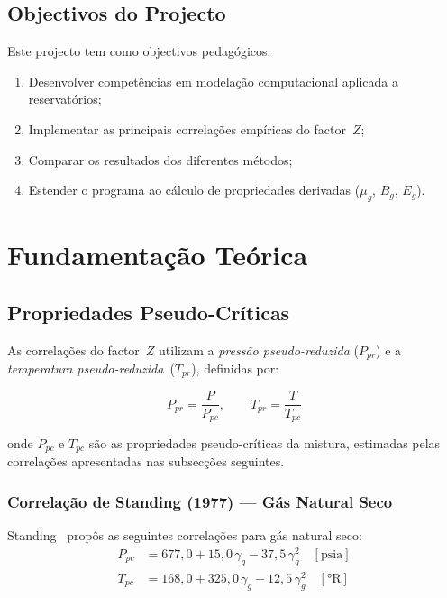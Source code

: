 \documentclass[12pt,a4paper]{article}
\begin{document}
\subsection{Objectivos do Projecto}

Este projecto tem como objectivos pedagógicos:
\begin{enumerate}[noitemsep]
  \item Desenvolver competências em modelação computacional aplicada a reservatórios;
  \item Implementar as principais correlações empíricas do factor~$Z$;
  \item Comparar os resultados dos diferentes métodos;
  \item Estender o programa ao cálculo de propriedades derivadas ($\mu_g$, $B_g$, $E_g$).
\end{enumerate}

\section{Fundamentação Teórica}

\subsection{Propriedades Pseudo-Críticas}

As correlações do factor~$Z$ utilizam a \emph{pressão pseudo-reduzida}
($P_{pr}$) e a \emph{temperatura pseudo-reduzida}~($T_{pr}$), definidas por:

\begin{equation}
  P_{pr} = \frac{P}{P_{pc}}, \qquad T_{pr} = \frac{T}{T_{pc}}
  \label{eq:reduzidas}
\end{equation}

\noindent onde $P_{pc}$ e $T_{pc}$ são as propriedades pseudo-críticas da
mistura, estimadas pelas correlações apresentadas nas subsecções seguintes.

\subsubsection{Correlação de Standing (1977) — Gás Natural Seco}

Standing~\cite{Standing1977} propôs as seguintes correlações para gás natural seco:
\begin{align}
  P_{pc} &= 677{,}0 + 15{,}0\,\gamma_g - 37{,}5\,\gamma_g^2 \quad [\text{psia}]
  \label{eq:standing_seco_ppc}\\
  T_{pc} &= 168{,}0 + 325{,}0\,\gamma_g - 12{,}5\,\gamma_g^2 \quad [°\text{R}]
  \label{eq:standing_seco_tpc}
\end{align}
\end{document}

